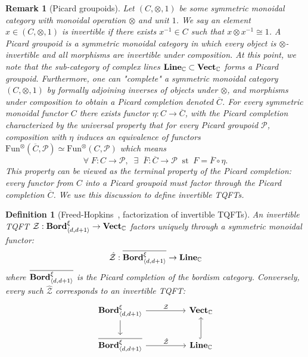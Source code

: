 \documentclass[aps,prx,reprint,superscriptaddress,twocolumn,amsmath,amssymb,amsfonts, nofootinbib]{revtex4-2}
\newcommand{\bordd}{{\bf Bord}_{\langle d, d+1\rangle}}
\newcommand{\vect}{{\bf Vect}_{\mathbb{C}}}
\newcommand{\Line}{{\bf Line}_{\mathbb{C}}}
\theoremstyle{apsstyle}
\newtheorem{definition}[theorem]{Definition}
\newtheorem{remark}[theorem]{Remark}
\begin{document}
\bigskip

\begin{remark}[Picard groupoids]
\label{rmk:picard}
Let $(C, \otimes, 1)$ be some symmetric monoidal category with monoidal operation $\otimes$ and unit $1$. We say an element $x\in (C, \otimes, 1)$ is invertible if there exists $x^{-1}\in C$ such that $x\otimes x^{-1}\cong 1$. A \textit{Picard groupoid} is a symmetric monoidal category in which every object is $\otimes$-invertible and all morphisms are invertible under composition. At this point, we note that the sub-category of complex lines $\Line \subset \vect$ forms a Picard groupoid. Furthermore, one can "complete" a symmetric monoidal category $(C, \otimes,1)$ by formally adjoining inverses of objects under $\otimes$, and morphisms under composition to obtain a \textit{Picard completion} denoted $\overline{C}$. For every symmetric monoidal functor $C$ there exists functor $\eta: C \to \overline{C}$, with the Picard completion characterized by the universal property that for every Picard groupoid $\mathcal{P}$, composition with $\eta$ induces an equivalence of functors $\mathrm{Fun}^{\otimes}(\overline{C}, \mathcal{P})\simeq \mathrm{Fun}^{\otimes}(C, \mathcal{P})$ which means
\begin{equation*}
    \forall \; F: C \to \mathcal{P},\;\; \exists\;\; \overline{F} : \overline{C}\to \mathcal{P}\;\;\text{st}\;\; F=\overline{F}\circ \eta.
\end{equation*}
This property can be viewed as the terminal property of the Picard completion: every functor from $C$ into a Picard groupoid must factor through the Picard completion $\overline{C}$. We use this discussion to define invertible TQFTs.
\end{remark}

\bigskip

\begin{definition}[Freed-Hopkins~\cite{Freed2021}, factorization of invertible TQFTs] An invertible TQFT $\mathcal{Z}: \bordd^{\xi} \to \vect$ factors uniquely through a symmetric monoidal functor:
\begin{equation*}
\hat{\mathcal{Z}}: \overline{\bordd^{\xi}}\to \Line
\end{equation*}
\noindent where $\overline{\bordd^{\xi}}$ is the Picard completion of the bordism category. Conversely, every such $\hat{\mathcal Z}$ corresponds to an invertible TQFT:
\begin{equation*}
    \begin{tikzcd}
        \bordd^{\xi} \arrow[d] \arrow[rr, "\mathcal{Z}"] &&\vect\\
        \overline{\bordd^{\xi}} \arrow[rr, "\hat{\mathcal{Z}}"] &&\Line \arrow[u, hookrightarrow]
    \end{tikzcd}
\end{equation*}
\end{definition}
\end{document}
